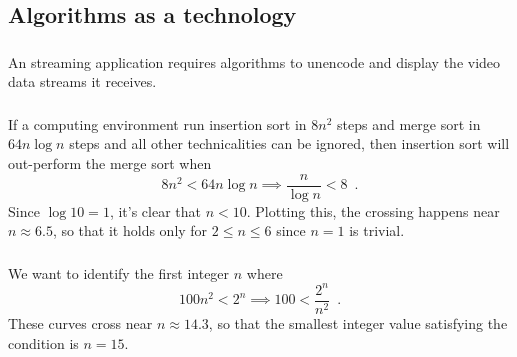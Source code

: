 \subsection{Algorithms as a technology}

\subsubsection{}
    An streaming application requires algorithms to unencode and display the video data streams it receives.

\subsubsection{}
    If a computing environment run insertion sort in $8n^2$ steps and merge sort in $64n\log n$ steps and all other technicalities can be ignored, then insertion sort will out-perform the merge sort when
    \begin{equation}
        8n^2 < 64 n \log n
        \implies 
        \frac{n}{\log n} < 8 \,\,\,.
    \end{equation}
    Since $\log 10 = 1$, it's clear that $n<10$.  Plotting this, the crossing happens near $n\approx6.5$, so that it holds only for $2\le n \le 6$ since $n=1$ is trivial.

\subsubsection{}
    We want to identify the first integer $n$ where
    \begin{equation}
        100n^2 < 2^n \implies 100 < \frac{2^n}{n^2} \,\,\,.
    \end{equation}
    These curves cross near $n\approx14.3$, so that the smallest integer value satisfying the condition is $n=15$.